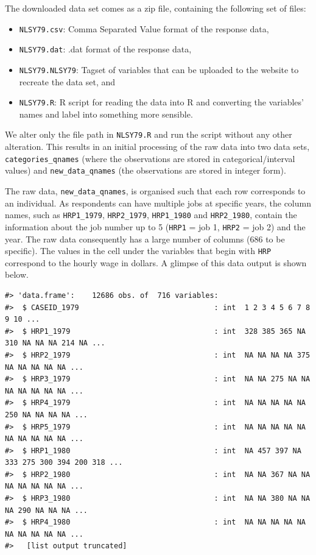 \documentclass{article}
\providecommand{\tightlist}{%
  \setlength{\itemsep}{0pt}\setlength{\parskip}{0pt}}
\begin{document}
The downloaded data set comes as a zip file, containing the following set of files:

\begin{itemize}
\tightlist
\item
  \texttt{NLSY79.csv}: Comma Separated Value format of the response data,
\item
  \texttt{NLSY79.dat}: .dat format of the response data,
\item
  \texttt{NLSY79.NLSY79}: Tagset of variables that can be uploaded to the website to recreate the data set, and
\item
  \texttt{NLSY79.R}: R script for reading the data into R and converting the variables' names and label into something more sensible.
\end{itemize}

We alter only the file path in \texttt{NLSY79.R} and run the script without any other alteration. This results in an initial processing of the raw data into two data sets, \texttt{categories\_qnames} (where the observations are stored in categorical/interval values) and \texttt{new\_data\_qnames} (the observations are stored in integer form).

The raw data, \texttt{new\_data\_qnames}, is organised such that each row corresponds to an individual. As respondents can have multiple jobs at specific years, the column names, such as \texttt{HRP1\_1979}, \texttt{HRP2\_1979}, \texttt{HRP1\_1980} and \texttt{HRP2\_1980}, contain the information about the job number up to 5 (\texttt{HRP1} = job 1, \texttt{HRP2} = job 2) and the year. The raw data consequently has a large number of columns (686 to be specific). The values in the cell under the variables that begin with \texttt{HRP} correspond to the hourly wage in dollars. A glimpse of this data output is shown below.

\begin{verbatim}
#> 'data.frame':    12686 obs. of  716 variables:
#>  $ CASEID_1979                               : int  1 2 3 4 5 6 7 8 9 10 ...
#>  $ HRP1_1979                                 : int  328 385 365 NA 310 NA NA NA 214 NA ...
#>  $ HRP2_1979                                 : int  NA NA NA NA 375 NA NA NA NA NA ...
#>  $ HRP3_1979                                 : int  NA NA 275 NA NA NA NA NA NA NA ...
#>  $ HRP4_1979                                 : int  NA NA NA NA NA 250 NA NA NA NA ...
#>  $ HRP5_1979                                 : int  NA NA NA NA NA NA NA NA NA NA ...
#>  $ HRP1_1980                                 : int  NA 457 397 NA 333 275 300 394 200 318 ...
#>  $ HRP2_1980                                 : int  NA NA 367 NA NA NA NA NA NA NA ...
#>  $ HRP3_1980                                 : int  NA NA 380 NA NA NA 290 NA NA NA ...
#>  $ HRP4_1980                                 : int  NA NA NA NA NA NA NA NA NA NA ...
#>   [list output truncated]
\end{verbatim}
\end{document}
